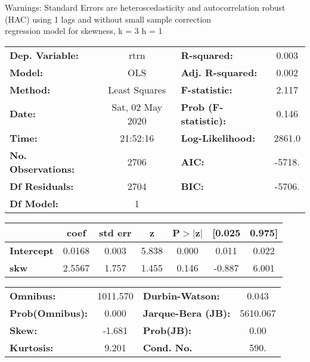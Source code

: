 Warnings: \newline
 [1] Standard Errors are heteroscedasticity and autocorrelation robust (HAC) using 1 lags and without small sample correction\\ 

regression model for skewness, k = 3 h = 1\begin{center}
\begin{tabular}{lclc}
\toprule
\textbf{Dep. Variable:}    &       rtrn       & \textbf{  R-squared:         } &     0.003   \\
\textbf{Model:}            &       OLS        & \textbf{  Adj. R-squared:    } &     0.002   \\
\textbf{Method:}           &  Least Squares   & \textbf{  F-statistic:       } &     2.117   \\
\textbf{Date:}             & Sat, 02 May 2020 & \textbf{  Prob (F-statistic):} &    0.146    \\
\textbf{Time:}             &     21:52:16     & \textbf{  Log-Likelihood:    } &    2861.0   \\
\textbf{No. Observations:} &        2706      & \textbf{  AIC:               } &    -5718.   \\
\textbf{Df Residuals:}     &        2704      & \textbf{  BIC:               } &    -5706.   \\
\textbf{Df Model:}         &           1      & \textbf{                     } &             \\
\bottomrule
\end{tabular}
\begin{tabular}{lcccccc}
                   & \textbf{coef} & \textbf{std err} & \textbf{z} & \textbf{P$> |$z$|$} & \textbf{[0.025} & \textbf{0.975]}  \\
\midrule
\textbf{Intercept} &       0.0168  &        0.003     &     5.838  &         0.000        &        0.011    &        0.022     \\
\textbf{skw}       &       2.5567  &        1.757     &     1.455  &         0.146        &       -0.887    &        6.001     \\
\bottomrule
\end{tabular}
\begin{tabular}{lclc}
\textbf{Omnibus:}       & 1011.570 & \textbf{  Durbin-Watson:     } &    0.043  \\
\textbf{Prob(Omnibus):} &   0.000  & \textbf{  Jarque-Bera (JB):  } & 5610.067  \\
\textbf{Skew:}          &  -1.681  & \textbf{  Prob(JB):          } &     0.00  \\
\textbf{Kurtosis:}      &   9.201  & \textbf{  Cond. No.          } &     590.  \\
\bottomrule
\end{tabular}
\end{center}

